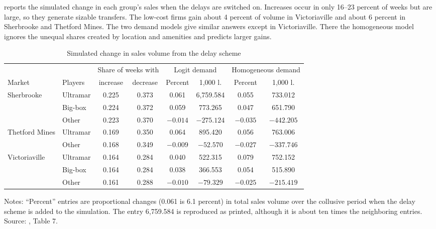  reports the simulated change in each group's sales when the delays are switched on. Increases occur in only
16--23 percent of weeks but are large, so they generate sizable transfers. The low-cost firms gain about 4 percent of volume in
Victoriaville and about 6 percent in Sherbrooke and Thetford Mines. The two demand models give similar answers except in
Victoriaville. There the homogeneous model ignores the unequal shares created by location and amenities and predicts larger gains.

\begin{table}[htbp]
\centering
\caption{Simulated change in sales volume from the delay scheme}\label{tab:13-ch-t7}
\small
\begin{tabular}{llcccccc}
\toprule
 & & \multicolumn{2}{c}{Share of weeks with} & \multicolumn{2}{c}{Logit demand} & \multicolumn{2}{c}{Homogeneous demand}\\
\cmidrule(lr){3-4}\cmidrule(lr){5-6}\cmidrule(lr){7-8}
Market & Players & increase & decrease & Percent & 1,000 l. & Percent & 1,000 l.\\
\midrule
Sherbrooke & Ultramar & 0.225 & 0.373 & 0.061 & 6,759.584 & 0.055 & 733.012\\
 & Big-box & 0.224 & 0.372 & 0.059 & 773.265 & 0.047 & 651.790\\
 & Other & 0.223 & 0.370 & $-0.014$ & $-275.124$ & $-0.035$ & $-442.205$\\
Thetford Mines & Ultramar & 0.169 & 0.350 & 0.064 & 895.420 & 0.056 & 763.006\\
 & Other & 0.168 & 0.349 & $-0.009$ & $-52.570$ & $-0.027$ & $-337.746$\\
Victoriaville & Ultramar & 0.164 & 0.284 & 0.040 & 522.315 & 0.079 & 752.152\\
 & Big-box & 0.164 & 0.284 & 0.038 & 366.553 & 0.054 & 515.890\\
 & Other & 0.161 & 0.288 & $-0.010$ & $-79.329$ & $-0.025$ & $-215.419$\\
\bottomrule
\end{tabular}

\smallskip
\begin{minipage}{0.92\textwidth}\footnotesize
Notes: ``Percent'' entries are proportional changes (0.061 is 6.1 percent) in total sales volume over the collusive period when
the delay scheme is added to the simulation. The entry 6,759.584 is reproduced as printed, although it is about ten times
the neighboring entries. Source: \citet{ClarkHoude2013}, Table 7.
\end{minipage}
\end{table}

